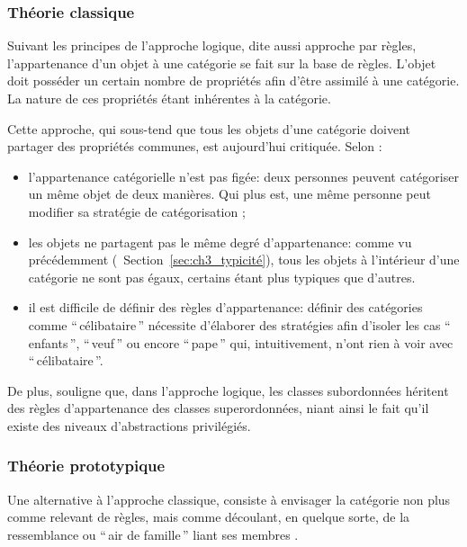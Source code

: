 \subsubsection{Théorie classique}

Suivant les principes de l'approche logique, dite aussi approche par règles, l'appartenance d'un objet à une catégorie se fait sur la base de règles. L'objet doit posséder un certain nombre de propriétés afin d'être assimilé à une catégorie. La nature de ces propriétés étant inhérentes à la catégorie.

Cette approche, qui sous-tend que tous les objets d'une catégorie doivent partager des propriétés communes, est aujourd'hui critiquée. Selon \citep{goldstone2003concepts}:

\begin{itemize}
\item l'appartenance catégorielle n'est pas figée: deux personnes peuvent catégoriser un même objet de deux manières. Qui plus est, une même personne peut modifier sa stratégie de catégorisation \citep{mccloskey1978natural};
\item les objets ne partagent pas le même degré d'appartenance: comme vu précédemment (\cf~Section~\ref{sec:ch3_typicité}), tous les objets à l'intérieur d'une catégorie ne sont pas égaux, certains étant plus typiques que d'autres.
\item il est difficile de définir des règles d'appartenance: définir des catégories comme ``\,célibataire\,'' nécessite d'élaborer des stratégies afin d'isoler les cas ``\,enfants\,'', ``\,veuf\,'' ou encore ``\,pape\,'' qui, intuitivement, n'ont rien à voir avec ``\,célibataire\,''. 
\end{itemize}

De plus, \citep[49]{Houix03f} souligne que, dans l'approche logique, les classes subordonnées héritent des règles d'appartenance des classes superordonnées, niant ainsi le fait qu'il existe des niveaux d'abstractions privilégiés. 

\subsubsection{Théorie prototypique}

Une alternative à l'approche classique, consiste à envisager la catégorie non plus comme relevant de règles, mais comme découlant, en quelque sorte, de la ressemblance ou ``\,air de famille\,'' liant ses membres \citep{ludwig1953philosophical}.

